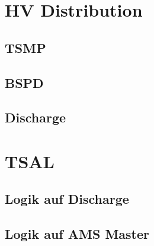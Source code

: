 \section{HV Distribution}

\subsection{TSMP}

\subsection{BSPD}

\subsection{Discharge}

\section{TSAL}

\subsection{Logik auf Discharge}

\subsection{Logik auf AMS Master}